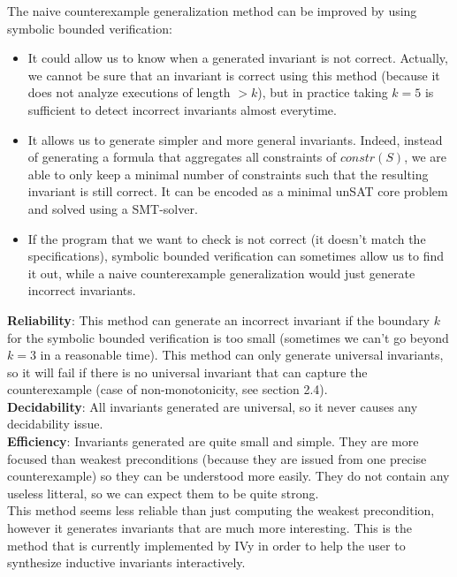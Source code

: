\documentclass[11pt,a4paper,oldfontcommands,openany]{memoir}
\begin{document}
    The naive counterexample generalization method can be improved by using symbolic bounded verification\cite{Padon:2016:ISV:2908080.2908118}:
    \begin{itemize}
        \item It could allow us to know when a generated invariant is not correct.
        Actually, we cannot be sure that an invariant is correct using this method (because it does not analyze executions of length \(> k\)),
        but in practice taking \(k=5\) is sufficient to detect incorrect invariants almost everytime.
        \item It allows us to generate simpler and more general invariants. Indeed, instead of generating a formula that
        aggregates all constraints of \(constr(S)\), we are able to only keep a minimal number of constraints
        such that the resulting invariant is still correct. It can be encoded as a minimal unSAT core problem and solved using a SMT-solver.
        \item If the program that we want to check is not correct (it doesn't match the specifications), symbolic bounded verification
        can sometimes allow us to find it out, while a naive counterexample generalization would just generate incorrect invariants.
    \end{itemize}\hfill

    \textbf{Reliability}: This method can generate an incorrect invariant if the boundary \(k\) for the symbolic bounded verification
    is too small (sometimes we can't go beyond \(k=3\) in a reasonable time). This method can only generate universal invariants,
    so it will fail if there is no universal invariant that can capture the counterexample (case of non-monotonicity, see section 2.4).\\

    \textbf{Decidability}: All invariants generated are universal, so it never causes any decidability issue.\\

    \textbf{Efficiency}: Invariants generated are quite small and simple. They are more focused than weakest preconditions
    (because they are issued from one precise counterexample) so they can be understood more easily.
    They do not contain any useless litteral, so we can expect them to be quite strong.\\

    This method seems less reliable than just computing the weakest precondition, however it generates invariants that are much more interesting.
    This is the method that is currently implemented by IVy in order to help the user to synthesize inductive invariants interactively.
\end{document}
